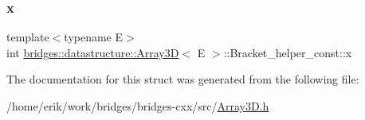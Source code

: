 \subsubsection{\texorpdfstring{x}{x}}
{\footnotesize\ttfamily template$<$typename E$>$ \\
int \hyperlink{classbridges_1_1datastructure_1_1_array3_d}{bridges\+::datastructure\+::\+Array3D}$<$ E $>$\+::Bracket\+\_\+helper\+\_\+const\+::x}



The documentation for this struct was generated from the following file\+:\begin{DoxyCompactItemize}
\item 
/home/erik/work/bridges/bridges-\/cxx/src/\hyperlink{_array3_d_8h}{Array3\+D.\+h}\end{DoxyCompactItemize}
